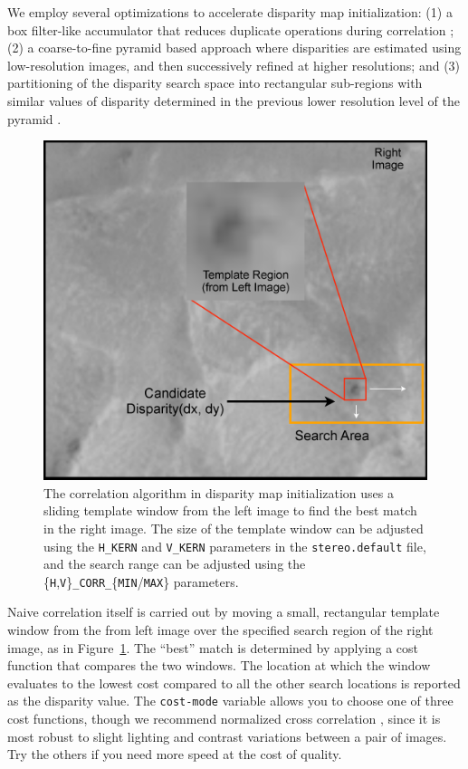We employ several optimizations to accelerate disparity map
initialization: (1) a box filter-like accumulator that reduces
duplicate operations during correlation \citep{Sun02rectangular}; (2) a
coarse-to-fine pyramid based approach where disparities are estimated
using low-resolution images, and then successively refined at higher
resolutions; and (3) partitioning of the disparity search space into
rectangular sub-regions with similar values of disparity determined in
the previous lower resolution level of the
pyramid \citep{Sun02rectangular}.

\begin{figure}[bt]
  \centering
  \includegraphics[width=13cm]{images/correlation/correlation}
  \caption{The correlation algorithm in disparity map initialization
    uses a sliding template window from the left image to find the
    best match in the right image.  The size of the template window
    can be adjusted using the \texttt{H\_KERN} and \texttt{V\_KERN} parameters in the
    \texttt{stereo.default} file, and the search range can be adjusted
    using the \{\texttt{H},\texttt{V}\}\texttt{\_CORR\_}\{\texttt{MIN}/\texttt{MAX}\} parameters.}
  \label{fig:correlation_window}
\end{figure}

Naive correlation itself is carried out by moving a small, rectangular
template window from the from left image over the specified search
region of the right image, as in Figure~\ref{fig:correlation_window}.
The ``best'' match is determined by applying a cost function that
compares the two windows. The location at which the window evaluates
to the lowest cost compared to all the other search locations is
reported as the disparity value. The \texttt{cost-mode} variable allows you
to choose one of three cost functions, though we recommend normalized
cross correlation \citep{Menard97:robust}, since it is most robust to
slight lighting and contrast variations between a pair of
images. Try the others if you need more speed at the cost of quality.

